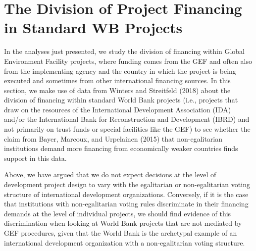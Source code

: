\documentclass{article}
\begin{document}
\section{The Division of Project Financing in Standard WB Projects}
In the analyses just presented, we study the division of financing within Global Environment Facility projects, where funding comes from the GEF and often also from the implementing agency and the country in which the project is being executed and sometimes from other international financing sources.  In this section, we make use of data from Winters and Streitfeld (2018) about the division of financing within standard World Bank projects (i.e., projects that draw on the resources of the International Development Association (IDA) and/or the International Bank for Reconstruction and Development (IBRD) and not primarily on trust funds or special facilities like the GEF) to see whether the claim from Bayer, Marcoux, and Urpelainen (2015) that non-egalitarian institutions demand more financing from economically weaker countries finds support in this data. 

Above, we have argued that we do not expect decisions at the level of development project design to vary with the egalitarian or non-egalitarian voting structure of international development organizations.  Conversely, if it is the case that institutions with non-egalitarian voting rules discriminate in their financing demands at the level of individual projects, we should find evidence of this discrimination when looking at World Bank projects that are not mediated by GEF procedures, given that the World Bank is the archetypal example of an international development organization with a non-egalitarian voting structure.
\end{document}
